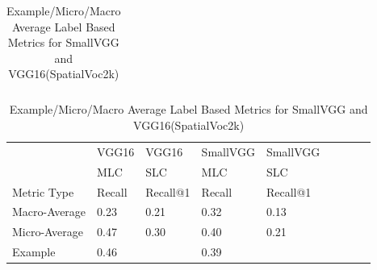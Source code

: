 \documentclass{IEEEtran}
\begin{document}
\begin{table}[!htbp]
\begin{tabular}{|l|l|l|l|l|l|l|l|l|l}
\end{tabular}
\caption{VGG16 and SmallVGG(SpatialVoc2k) results for MLC and SLC}
\centering
\begin{tabular}{|l|l|l|l|l|llll}
\cline{1-5}
	   		  & VGG16 & VGG16   & SmallVGG & SmallVGG  		\\ \cline{1-5}
       		  &  MLC  	 & SLC      &  MLC      & SLC       \\ \cline{1-5}
Metric Type   &  Recall  & Recall@1 &  Recall   & Recall@1  \\ \cline{1-5}
Macro-Average &	0.23	&	0.21	&	0.32 	&	0.13	\\ \cline{1-5}
Micro-Average &	0.47	&	0.30	&	0.40	&	0.21	\\ \cline{1-5}
Example       &	0.46	& 			&	0.39	&			\\ \cline{1-5}
\end{tabular}
\caption{Example/Micro/Macro Average Label Based Metrics for SmallVGG and VGG16(SpatialVoc2k)}
\end{table}
\end{document}
